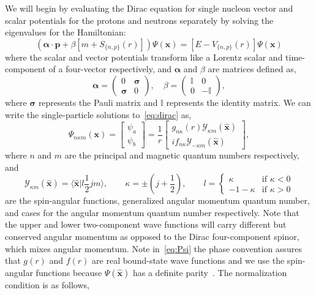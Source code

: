 We will begin by evaluating the Dirac equation for single nucleon vector and scalar potentials for the protons and neutrons separately by solving the eigenvalues for the Hamiltonian:
\begin{equation}\label{eq:dirac}
\left( \boldsymbol{\alpha}\cdot \mathbf{p}+\beta [m+S_{\lbrace n,p\rbrace}(r)] \right) \Psi (\mathbf{x}) = \left[ E-V_{\lbrace n,p\rbrace}(r) \right] \Psi (\mathbf{x})
\end{equation}
where the scalar and vector potentials transform like a Lorentz scalar and time-component of a four-vector respectively, and $\boldsymbol{\alpha}$ and $\beta$ are matrices defined as,
\begin{equation}
\boldsymbol{\alpha} = 
\begin{pmatrix}
0 & \boldsymbol{\sigma} \\
\boldsymbol{\sigma} & 0
\end{pmatrix}, \quad 
\beta = 
\begin{pmatrix}
\mathbb{I} & 0 \\
0 & -\mathbb{I}
\end{pmatrix},
\end{equation}
where $\boldsymbol{\sigma}$ represents the Pauli matrix and $\mathbb{I}$ represents the identity matrix. We can write the single-particle solutions to~\eqref{eq:dirac} as,
\begin{equation}\label{eq:Psi}
\Psi_{n\kappa m}(\mathbf{x}) =
\begin{bmatrix}
\psi _a \\
\psi _b
\end{bmatrix}
= \frac{1}{r}
\begin{bmatrix}
g_{n\kappa}(r)\mathcal{Y}_{\kappa m}(\hat{\mathbf{x}}) \\
i f_{n\kappa}\mathcal{Y}_{-\kappa m}(\hat{\mathbf{x}})
\end{bmatrix},
\end{equation} 
where $n$ and $m$ are the principal and magnetic quantum numbers respectively, and
\begin{equation*}
\mathcal{Y}_{\kappa m}(\hat{\mathbf{x}})= \langle \hat{\mathbf{x}}| l\frac{1}{2}j m \rangle, 
\qquad
\kappa = \pm \left( j+\frac{1}{2} \right),
\qquad
l = 
\begin{cases}
\kappa & \text{if } \kappa < 0 \\
-1-\kappa & \text{if } \kappa > 0 
\end{cases}
\end{equation*}
are the spin-angular functions, generalized angular momentum quantum number, and cases for the angular momentum quantum number respectively. Note that the upper and lower two-component wave functions will carry different but conserved angular momentum as opposed to the Dirac four-component spinor, which mixes angular momentum. Note in~\eqref{eq:Psi} the phase convention assures that $g(r)$ and $f(r)$ are real bound-state wave functions and we use the spin-angular functions because $\Psi(\hat{\mathbf{x}})$ has a definite parity~\cite{sakurai:1987:advanced}. The normalization condition is as follows,

